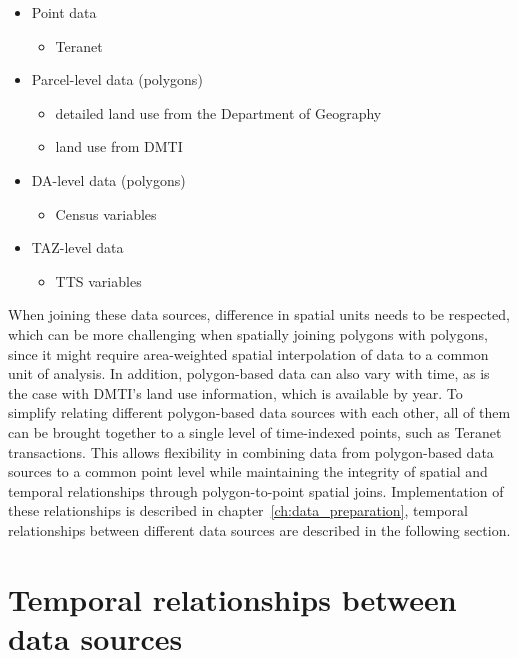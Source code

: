 \begin{itemize}
    \item Point data
    \begin{itemize}
        \item Teranet
    \end{itemize}
    \item Parcel-level data (polygons)
    \begin{itemize}
        \item detailed land use from the Department of Geography
        \item land use from DMTI
    \end{itemize}
    \item DA-level data (polygons)
    \begin{itemize}
        \item Census variables
    \end{itemize}
    \item TAZ-level data
    \begin{itemize}
        \item TTS variables
    \end{itemize}
\end{itemize}

When joining these data sources, difference in spatial units needs to be respected, which can be more challenging when spatially joining polygons with polygons, since it might require area-weighted spatial interpolation of data to a common unit of analysis.
In addition, polygon-based data can also vary with time, as is the case with DMTI's land use information, which is available by year.
To simplify relating different polygon-based data sources with each other, all of them can be brought together to a single level of time-indexed points, such as Teranet transactions.
This allows flexibility in combining data from polygon-based data sources to a common point level while maintaining the integrity of spatial and temporal relationships through polygon-to-point spatial joins.
Implementation of these relationships is described in chapter~\ref{ch:data_preparation}, temporal relationships between different data sources are described in the following section.

\section{Temporal relationships between data sources} \label{sec:termporal_relationships_between_datasets}

